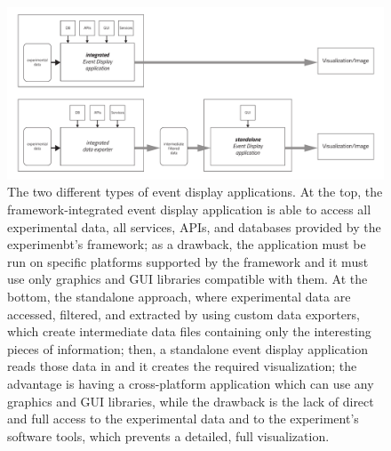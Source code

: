 \documentclass[12pt,a4paper]{article}
\begin{document}
\begin{figure}
	\centering
	\includegraphics[width=\linewidth]{img/eventDisplays_applications_types}
	\caption[Different types of event display applications]{The two different types of event display applications. At the top,
	the framework-integrated event display application is able to access all experimental data, all services, APIs, and databases
	provided by the experimenbt's framework; as a drawback, the application must be run on specific platforms supported by the
	framework and it must use only graphics and GUI libraries compatible with them. At the bottom, the standalone approach, where
	experimental data are accessed, filtered, and extracted by using custom data exporters, which create intermediate data files
	containing only the interesting pieces of information; then, a standalone event display application reads those data in and it
	creates the required visualization; the advantage is having a cross-platform application which can use any graphics and GUI libraries,
	while the drawback is the lack of direct and full access to the experimental data and to the experiment's software tools,
	which prevents a detailed, full visualization.}
	\label{fig:eventdisplaysapplicationstypes}
\end{figure}


\end{document}
